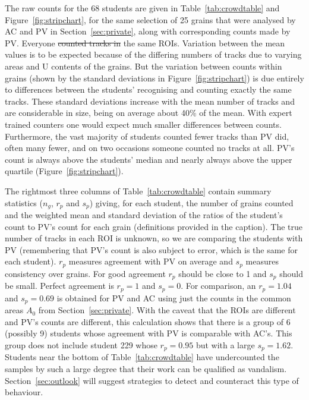 \documentclass[gchron, manuscript]{copernicus}
\providecommand{\DIFaddtex}[1]{{\protect\color{blue}\uwave{#1}}} %
\providecommand{\DIFdeltex}[1]{{\protect\color{red}\sout{#1}}}                      %
\providecommand{\DIFaddbegin}{} %
\providecommand{\DIFaddend}{} %
\providecommand{\DIFdelbegin}{} %
\providecommand{\DIFdelend}{} %
\providecommand{\DIFadd}[1]{\texorpdfstring{\DIFaddtex{#1}}{#1}} %
\providecommand{\DIFdel}[1]{\texorpdfstring{\DIFdeltex{#1}}{}} %
\begin{document}
The raw counts for the 68 students are given in
Table~\ref{tab:crowdtable} and Figure~\ref{fig:stripchart}, for the
same selection of 25 grains that were analysed by AC and PV in
Section~\ref{sec:private}, along with corresponding counts made by
PV. Everyone \DIFdelbegin \DIFdel{counted tracks in }\DIFdelend \DIFaddbegin \DIFadd{analysed }\DIFaddend the same ROIs. Variation between the mean values
is to be expected because of the differing numbers of tracks due to
varying areas and U contents of the grains. But the variation between
counts within grains (shown by the standard deviations in
Figure~\ref{fig:stripchart}) is due entirely to differences between
the students' recognising and counting exactly the same tracks. These
standard deviations increase with the mean number of tracks and are
considerable in size, being on average about 40\% of the mean. With
expert trained counters one would expect much smaller differences
between counts.  Furthermore, the vast majority of students counted
fewer tracks than PV did, often many fewer, and on two occasions
someone counted no tracks at all. PV's count is always above the
students' median and nearly always above the upper quartile
(Figure~\ref{fig:stripchart}).\medskip

The rightmost three columns of Table~\ref{tab:crowdtable} contain
summary statistics ($n_g$, $r_p$ and $s_p$) giving, for each student,
the number of grains counted and the weighted mean and standard
deviation of the ratios of the student's count to PV's count for each
grain (definitions provided in the caption). The true number of tracks
in each ROI is unknown, so we are comparing the students with PV
(remembering that PV's count is also subject to error, which is the
same for each student). $r_p$ measures agreement with PV on average
and $s_p$ measures consistency over grains. For good agreement $r_p$
should be close to 1 and $s_p$ should be small.  Perfect agreement is
$r_p = 1$ and $s_p = 0$. For comparison, an $r_p = 1.04$ and $s_p =
0.69$ is obtained for PV and AC using just the counts in the common
areas $A_0$ from Section~\ref{sec:private}. With the caveat that the
ROIs are different and PV's counts are different, this calculation
shows that there is a group of 6 (possibly 9) students whose agreement
with PV is comparable with AC's. This group does not include student
229 whose $r_p = 0.95$ but with a large $s_p = 1.62$. Students near
the bottom of Table~\ref{tab:crowdtable} have undercounted the samples
by such a large degree that their work can be qualified as
vandalism. Section~\ref{sec:outlook} will suggest strategies to detect
and counteract this type of behaviour.\medskip
\end{document}
